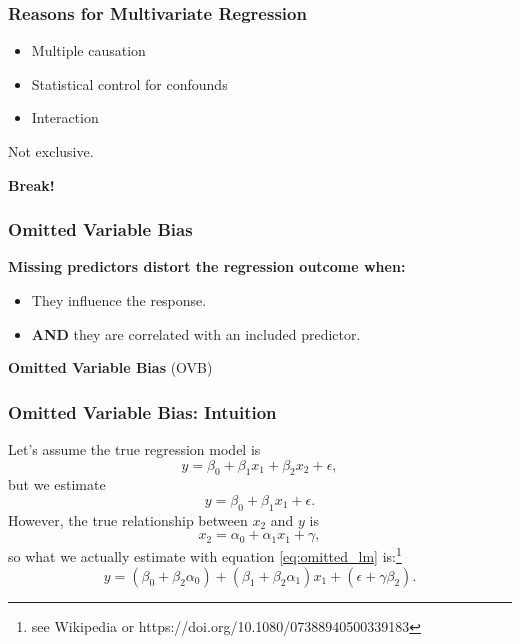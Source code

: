\documentclass{beamer}
\begin{document}
\begin{frame}
  \frametitle{Reasons for Multivariate Regression}
  \begin{itemize}
    \item Multiple causation
    \item Statistical control for confounds
    \item Interaction
  \end{itemize}

Not exclusive.

\end{frame}

\begin{frame}
    \centering
    \huge\color{purple}\textbf{Break!}
\end{frame}

\begin{frame}
  \frametitle{Omitted Variable Bias}
  \textbf{Missing predictors distort the regression outcome when:}
  \begin{itemize}
    \item They influence the response.
    \item \textbf{AND} they are correlated with an included predictor.
  \end{itemize}

\vspace{0.5cm}
  
  \begin{block}{}
  \centering
    \large\textbf{Omitted Variable Bias} (OVB)
  \end{block}
\end{frame}

\begin{frame}
  \frametitle{Omitted Variable Bias: Intuition}

Let's assume the true regression model is
\begin{equation}
    y = \beta_0 + \beta_1 x_1 + \beta_2 x_2 + \epsilon,
\end{equation}
but we estimate
\begin{equation} \label{eq:omitted_lm}
    y = \beta_0 + \beta_1 x_1 + \epsilon.
\end{equation}
However, the true relationship between $x_2$ and $y$ is
\begin{equation*}
    x_2 = \alpha_0 + \alpha_1 x_1 + \gamma,
\end{equation*}
so what we actually estimate with equation \ref{eq:omitted_lm} is:\footnote{see Wikipedia or https://doi.org/10.1080/07388940500339183}
\begin{equation*}
    y = (\beta_0 + \beta_2 \alpha_0) + (\beta_1 + \beta_2 \alpha_1) x_1 + (\epsilon + \gamma \beta_2).
\end{equation*}

\end{frame}
\end{document}
